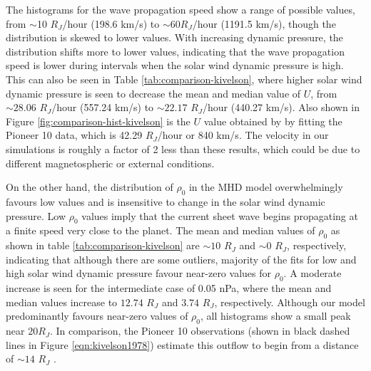 The histograms for the wave propagation speed show a range of possible values, from $\sim$10 $R_J$/hour (198.6 km/s) to $\sim60 R_J$/hour (1191.5 km/s), though the distribution is skewed to lower values. With increasing dynamic pressure, the distribution shifts more to lower values, indicating that the wave propagation speed is lower during intervals when the solar wind dynamic pressure is high. This can also be seen in Table \ref{tab:comparison-kivelson}, where higher solar wind dynamic pressure is seen to decrease the mean and median value of $U$, from $\sim28.06$ $R_J$/hour (557.24 km/s) to $\sim22.17$ $R_J$/hour (440.27 km/s). Also shown in Figure \ref{fig:comparison-hist-kivelson} is the $U$ value obtained by  by fitting the Pioneer 10 data, which is 42.29 $R_J$/hour or 840 km/s. The velocity in our simulations is roughly a factor of 2 less than these results, which could be due to different magnetospheric or external conditions. 

On the other hand, the distribution of $\rho_0$ in the MHD model overwhelmingly favours low values and is insensitive to change in the solar wind dynamic pressure. Low $\rho_0$ values imply that the current sheet wave begins propagating at a finite speed very close to the planet. The mean and median values of $\rho_0$ as shown in table \ref{tab:comparison-kivelson} are $\sim10$ $R_J$ and $\sim 0$ $R_J$, respectively, indicating that although there are some outliers, majority of the fits for low and high solar wind dynamic pressure favour near-zero values for $\rho_0$. A moderate increase is seen for the intermediate case of 0.05 nPa, where the mean and median values increase to $12.74$ $R_J$ and $3.74$ $R_J$, respectively. Although our model predominantly favours near-zero values of $\rho_0$, all histograms show a small peak near $20R_J$. In comparison, the Pioneer 10 observations (shown in black dashed lines in Figure \ref{eqn:kivelson1978}) estimate this outflow to begin from a distance of $\sim14$ $R_J$ \cite{Kivelson1978ASheet}.  

